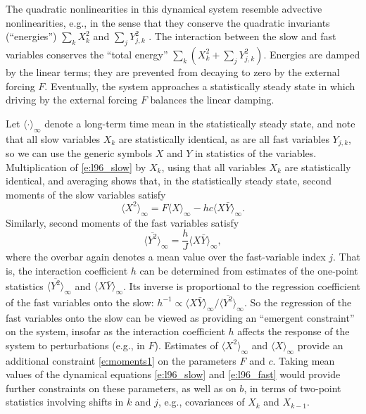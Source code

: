 \documentclass[draft]{agujournal}
\begin{document}
The quadratic nonlinearities in this dynamical system resemble advective nonlinearities, e.g., in the sense that they conserve the quadratic invariants (``energies'')  $\sum_{k} X_k^2$ and $\sum_{j} Y_{j, k}^2$ \citep{Lorenz98a}.  The interaction between the slow and fast variables conserves the ``total energy'' $\sum_k \left(X_k^2 + \sum_j Y_{j, k}^2\right)$. Energies are damped by the linear terms; they are prevented from decaying to zero by the external forcing $F$. Eventually, the system approaches a statistically steady state in which driving by the external forcing $F$ balances the linear damping. 

Let $\langle \cdot \rangle_\infty$ denote a long-term time mean in the statistically steady state, and note that all slow variables $X_k$ are statistically identical, as are all fast variables $Y_{j,k}$, so we can use the generic symbols $X$ and $Y$ in statistics of the variables. Multiplication of \eqref{e:l96_slow} by $X_k$, using that all variables $X_k$ are statistically identical, and averaging shows that, in the statistically steady state, second moments of the slow variables satisfy
\begin{equation}\label{e:moments1}
\langle X^2 \rangle_\infty = F \langle X \rangle_\infty - hc \langle X \bar Y \rangle_\infty.
\end{equation}
Similarly, second moments of the fast variables satisfy 
\begin{equation}\label{e:moments2}
\langle \overline{Y^2} \rangle_\infty = \frac{h}{J} \langle X \bar Y \rangle_\infty,
\end{equation}
where the overbar again denotes a mean value over the fast-variable index $j$. That is, the interaction coefficient $h$ can be determined from estimates of the one-point statistics $\langle \overline{Y^2} \rangle_\infty$ and $\langle X \bar Y \rangle_\infty$. Its inverse is proportional to the regression coefficient of the fast variables onto the slow: $h^{-1} \propto \langle X \bar Y \rangle_\infty/\langle \overline{Y^2} \rangle_\infty$. So the regression of the fast variables onto the slow can be viewed as providing an ``emergent  constraint'' on the system, insofar as the interaction coefficient $h$ affects the response of the system to perturbations (e.g., in $F$). Estimates of $\langle X^2 \rangle_\infty$ and $\langle X \rangle_\infty$ provide an additional constraint \eqref{e:moments1} on the parameters $F$ and $c$. Taking mean values of the dynamical equations \eqref{e:l96_slow} and \eqref{e:l96_fast} would provide further constraints on these parameters, as well as on $b$, in terms of two-point statistics involving shifts in $k$ and $j$, e.g., covariances of $X_k$ and $X_{k-1}$. 
\end{document}
